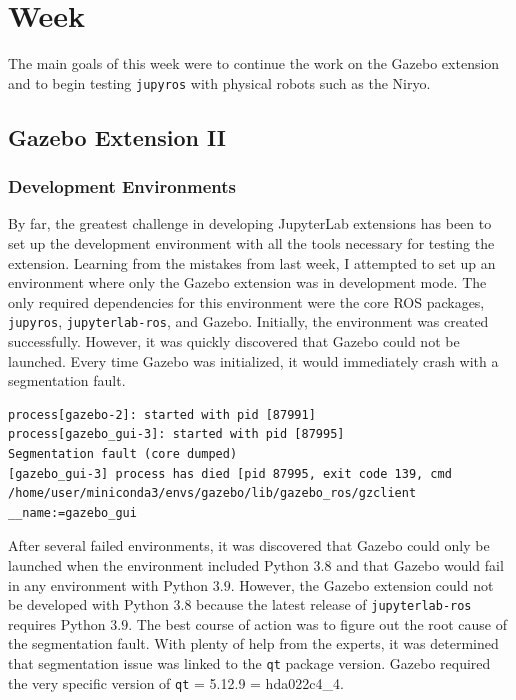 \chapter{Week}

    The main goals of this week were to continue the work on the Gazebo extension and to begin testing \texttt{jupyros} with physical robots such as the Niryo.

\section{Gazebo Extension II}

    \subsection{Development Environments}
    
    By far, the greatest challenge in developing JupyterLab extensions has been to set up the development environment with all the tools necessary for testing the extension. Learning from the mistakes from last week, I attempted to set up an environment where only the Gazebo extension was in development mode. The only required dependencies for this environment were the core ROS packages, \texttt{jupyros}, \texttt{jupyterlab-ros}, and Gazebo. Initially, the environment was created successfully. However, it was quickly discovered that Gazebo could not be launched. Every time Gazebo was initialized, it would immediately crash with a segmentation fault.
    
    \begin{lstlisting}[language=Console]
process[gazebo-2]: started with pid [87991]          
process[gazebo_gui-3]: started with pid [87995] 
Segmentation fault (core dumped)
[gazebo_gui-3] process has died [pid 87995, exit code 139, cmd /home/user/miniconda3/envs/gazebo/lib/gazebo_ros/gzclient __name:=gazebo_gui 
    \end{lstlisting}
    
    After several failed environments, it was discovered that Gazebo could only be launched when the environment included Python $3.8$ and that Gazebo would fail in any environment with Python $3.9$. However, the Gazebo extension could not be developed with Python $3.8$ because the latest release of \texttt{jupyterlab-ros} requires Python $3.9$. The best course of action was to figure out the root cause of the segmentation fault. With plenty of help from the experts, it was determined that segmentation issue was linked to the \texttt{qt} package version. Gazebo required the very specific version of \texttt{qt} = 5.12.9 = hda022c4\_4. 
    
